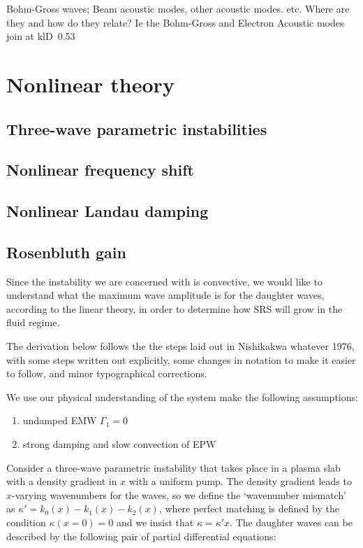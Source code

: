 Bohm-Gross waves; Beam acoustic modes, other acoustic modes.
etc. Where are they and how do they relate? Ie the Bohm-Gross and Electron
Acoustic modes join at klD~0.53

\section{Nonlinear theory}
\subsection{Three-wave parametric instabilities}
\subsection{Nonlinear frequency shift}
\subsection{Nonlinear Landau damping}

\subsection{Rosenbluth gain}

Since the instability we are concerned with is convective, we would like to understand what the maximum wave amplitude is for the daughter waves, according to the linear theory, in order to determine how SRS will grow in the fluid regime.

The derivation below follows the the steps laid out in Nishikakwa whatever 1976, with some steps written out explicitly, some changes in notation to make it easier to follow, and minor typographical corrections. 

We use our physical understanding of the system make the following assumptions:
\begin{enumerate}
	\item undamped EMW $\Gamma_1 = 0$
	\item strong damping and slow convection of EPW
\end{enumerate}

Consider a three-wave parametric instability that takes place in a plasma slab with a density gradient in $x$ with a uniform pump. The density gradient leads to $x$-varying wavenumbers for the waves, so we define the `wavenumber mismatch' as $\kappa' = k_0(x) - k_1(x) - k_2(x)$, where perfect matching is defined by the condition $\kappa(x=0) = 0$ and we insist that $\kappa = \kappa' x$. The daughter waves can be described by the following pair of partial differential equations:

